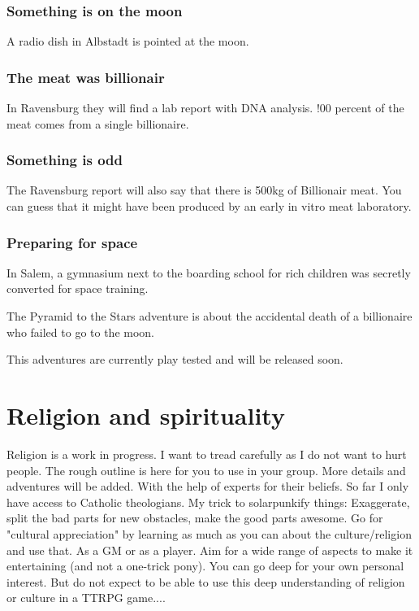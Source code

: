 \subsubsection{Something is on the moon}

A radio dish in Albstadt is pointed at the moon.

\subsubsection{The meat was billionair}

In Ravensburg they will find a lab report with DNA analysis. !00 percent of the meat comes from a single billionaire.

\subsubsection{Something is odd}

The Ravensburg report will also say that there is 500kg of Billionair meat. You can guess that it might have been produced by an early in vitro meat laboratory.

\subsubsection{Preparing for space}

In Salem, a gymnasium next to the boarding school for rich children was secretly converted for space training.

The Pyramid to the Stars adventure is about the accidental death of a billionaire who failed to go to the moon.

\begin{warning}
    This adventures are currently play tested and will be released soon.
\end{warning}
\newpage



\section{Religion and spirituality}

\begin{warning}
    Religion is a work in progress. I want to tread carefully as I do not want to hurt people. The rough outline is here for you to use in your group. More details and adventures will be added. With the help of experts for their beliefs. So far I only have access to Catholic theologians.
    My trick to solarpunkify things: Exaggerate, split the bad parts for new obstacles, make the good parts awesome. Go for "cultural appreciation" by learning as much as you can about the culture/religion and use that. As a GM or as a player. Aim for a wide range of aspects to make it entertaining (and not a one-trick pony). You can go deep for your own personal interest. But do not expect to be able to use this deep understanding of religion or culture in a TTRPG game....
\end{warning}

